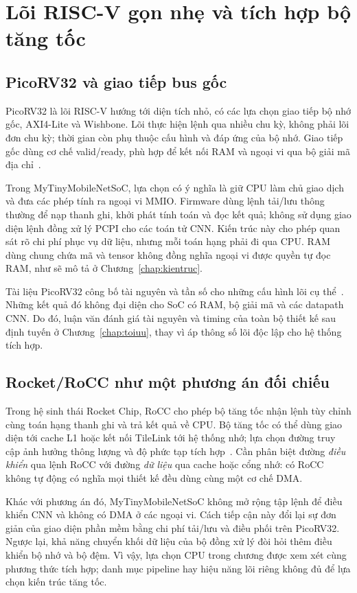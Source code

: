 \section{Lõi RISC-V gọn nhẹ và tích hợp bộ tăng tốc}
\subsection{PicoRV32 và giao tiếp bus gốc}
PicoRV32 là lõi RISC-V hướng tới diện tích nhỏ, có các lựa chọn giao tiếp bộ nhớ gốc, AXI4-Lite và Wishbone. Lõi thực hiện lệnh qua nhiều chu kỳ, không phải lõi đơn chu kỳ; thời gian còn phụ thuộc cấu hình và đáp ứng của bộ nhớ. Giao tiếp gốc dùng cơ chế valid/ready, phù hợp để kết nối RAM và ngoại vi qua bộ giải mã địa chỉ~\cite[README: Variants; PicoRV32 Native Memory Interface; Cycles per Instruction]{YosysHQ2024}.

Trong MyTinyMobileNetSoC, lựa chọn có ý nghĩa là giữ CPU làm chủ giao dịch và đưa các phép tính ra ngoại vi MMIO. Firmware dùng lệnh tải/lưu thông thường để nạp thanh ghi, khởi phát tính toán và đọc kết quả; không sử dụng giao diện lệnh đồng xử lý PCPI cho các toán tử CNN. Kiến trúc này cho phép quan sát rõ chi phí phục vụ dữ liệu, nhưng mỗi toán hạng phải đi qua CPU. RAM dùng chung chứa mã và tensor không đồng nghĩa ngoại vi được quyền tự đọc RAM, như sẽ mô tả ở Chương~\ref{chap:kientruc}.

Tài liệu PicoRV32 công bố tài nguyên và tần số cho những cấu hình lõi cụ thể~\cite[README: Features; Performance]{YosysHQ2024}. Những kết quả đó không đại diện cho SoC có RAM, bộ giải mã và các datapath CNN. Do đó, luận văn đánh giá tài nguyên và timing của toàn bộ thiết kế sau định tuyến ở Chương~\ref{chap:toiuu}, thay vì áp thông số lõi độc lập cho hệ thống tích hợp.

\subsection{Rocket/RoCC như một phương án đối chiếu}
Trong hệ sinh thái Rocket Chip, RoCC cho phép bộ tăng tốc nhận lệnh tùy chỉnh cùng toán hạng thanh ghi và trả kết quả về CPU. Bộ tăng tốc có thể dùng giao diện tới cache L1 hoặc kết nối TileLink tới hệ thống nhớ; lựa chọn đường truy cập ảnh hưởng thông lượng và độ phức tạp tích hợp~\cite{chipyardRoCC}. Cần phân biệt đường \emph{điều khiển} qua lệnh RoCC với đường \emph{dữ liệu} qua cache hoặc cổng nhớ: có RoCC không tự động có nghĩa mọi thiết kế đều dùng cùng một cơ chế DMA.

Khác với phương án đó, MyTinyMobileNetSoC không mở rộng tập lệnh để điều khiển CNN và không có DMA ở các ngoại vi. Cách tiếp cận này đổi lại sự đơn giản của giao diện phần mềm bằng chi phí tải/lưu và điều phối trên PicoRV32. Ngược lại, khả năng chuyển khối dữ liệu của bộ đồng xử lý đòi hỏi thêm điều khiển bộ nhớ và bộ đệm. Vì vậy, lựa chọn CPU trong chương được xem xét cùng phương thức tích hợp; danh mục pipeline hay hiệu năng lõi riêng không đủ để lựa chọn kiến trúc tăng tốc.
